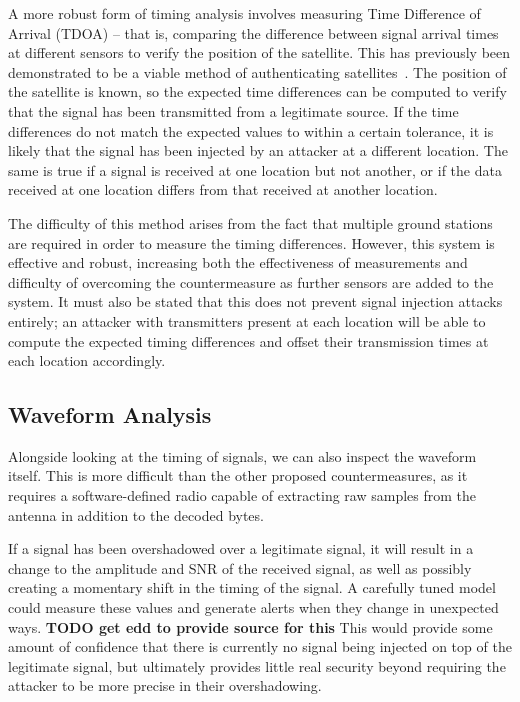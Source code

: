 A more robust form of timing analysis involves measuring Time Difference of Arrival (TDOA) -- that is, comparing the difference between signal arrival times at different sensors to verify the position of the satellite.
This has previously been demonstrated to be a viable method of authenticating satellites~\cite{jedermann2021orbit}.
The position of the satellite is known, so the expected time differences can be computed to verify that the signal has been transmitted from a legitimate source.
If the time differences do not match the expected values to within a certain tolerance, it is likely that the signal has been injected by an attacker at a different location.
The same is true if a signal is received at one location but not another, or if the data received at one location differs from that received at another location.

The difficulty of this method arises from the fact that multiple ground stations are required in order to measure the timing differences.
However, this system is effective and robust, increasing both the effectiveness of measurements and difficulty of overcoming the countermeasure as further sensors are added to the system.
It must also be stated that this does not prevent signal injection attacks entirely; an attacker with transmitters present at each location will be able to compute the expected timing differences and offset their transmission times at each location accordingly.


\subsection{Waveform Analysis}

Alongside looking at the timing of signals, we can also inspect the waveform itself.
This is more difficult than the other proposed countermeasures, as it requires a software-defined radio capable of extracting raw samples from the antenna in addition to the decoded bytes.

If a signal has been overshadowed over a legitimate signal, it will result in a change to the amplitude and SNR of the received signal, as well as possibly creating a momentary shift in the timing of the signal.
A carefully tuned model could measure these values and generate alerts when they change in unexpected ways.
\textbf{TODO get edd to provide source for this}
This would provide some amount of confidence that there is currently no signal being injected on top of the legitimate signal, but ultimately provides little real security beyond requiring the attacker to be more precise in their overshadowing.

